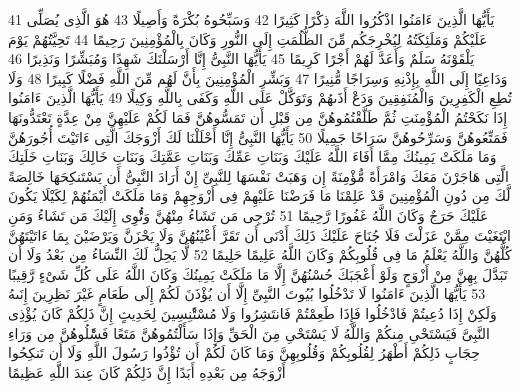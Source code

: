 \documentclass[20pt,a4paper]{article}
\begin{document}
{\tiny\colorbox{cl_aya}{41}} يَأَيُّهَا الَّذِينَ ءَامَنُوا اذْكُرُوا اللَّهَ ذِكْرًا كَثِيرًا
{\tiny\colorbox{cl_aya}{42}} وَسَبِّحُوهُ بُكْرَةً وَأَصِيلًا
{\tiny\colorbox{cl_aya}{43}} هُوَ الَّذِى يُصَلِّى عَلَيْكُمْ وَمَلَئِكَتُهُ لِيُخْرِجَكُم مِّنَ الظُّلُمَتِ إِلَى النُّورِ وَكَانَ بِالْمُؤْمِنِينَ رَحِيمًا
{\tiny\colorbox{cl_aya}{44}} تَحِيَّتُهُمْ يَوْمَ يَلْقَوْنَهُ سَلَمٌ وَأَعَدَّ لَهُمْ أَجْرًا كَرِيمًا
{\tiny\colorbox{cl_aya}{45}} يَأَيُّهَا النَّبِىُّ إِنَّا أَرْسَلْنَكَ شَهِدًا وَمُبَشِّرًا وَنَذِيرًا
{\tiny\colorbox{cl_aya}{46}} وَدَاعِيًا إِلَى اللَّهِ بِإِذْنِهِ وَسِرَاجًا مُّنِيرًا
{\tiny\colorbox{cl_aya}{47}} وَبَشِّرِ الْمُؤْمِنِينَ بِأَنَّ لَهُم مِّنَ اللَّهِ فَضْلًا كَبِيرًا
{\tiny\colorbox{cl_aya}{48}} وَلَا تُطِعِ الْكَفِرِينَ وَالْمُنَفِقِينَ وَدَعْ أَذَىهُمْ وَتَوَكَّلْ عَلَى اللَّهِ وَكَفَى بِاللَّهِ وَكِيلًا
{\tiny\colorbox{cl_aya}{49}} يَأَيُّهَا الَّذِينَ ءَامَنُوا إِذَا نَكَحْتُمُ الْمُؤْمِنَتِ ثُمَّ طَلَّقْتُمُوهُنَّ مِن قَبْلِ أَن تَمَسُّوهُنَّ فَمَا لَكُمْ عَلَيْهِنَّ مِنْ عِدَّةٍ تَعْتَدُّونَهَا فَمَتِّعُوهُنَّ وَسَرِّحُوهُنَّ سَرَاحًا جَمِيلًا
{\tiny\colorbox{cl_aya}{50}} يَأَيُّهَا النَّبِىُّ إِنَّا أَحْلَلْنَا لَكَ أَزْوَجَكَ الَّتِى ءَاتَيْتَ أُجُورَهُنَّ وَمَا مَلَكَتْ يَمِينُكَ مِمَّا أَفَاءَ اللَّهُ عَلَيْكَ وَبَنَاتِ عَمِّكَ وَبَنَاتِ عَمَّتِكَ وَبَنَاتِ خَالِكَ وَبَنَاتِ خَلَتِكَ الَّتِى هَاجَرْنَ مَعَكَ وَامْرَأَةً مُّؤْمِنَةً إِن وَهَبَتْ نَفْسَهَا لِلنَّبِىِّ إِنْ أَرَادَ النَّبِىُّ أَن يَسْتَنكِحَهَا خَالِصَةً لَّكَ مِن دُونِ الْمُؤْمِنِينَ قَدْ عَلِمْنَا مَا فَرَضْنَا عَلَيْهِمْ فِى أَزْوَجِهِمْ وَمَا مَلَكَتْ أَيْمَنُهُمْ لِكَيْلَا يَكُونَ عَلَيْكَ حَرَجٌ وَكَانَ اللَّهُ غَفُورًا رَّحِيمًا
{\tiny\colorbox{cl_aya}{51}} تُرْجِى مَن تَشَاءُ مِنْهُنَّ وَتُْٔوِى إِلَيْكَ مَن تَشَاءُ وَمَنِ ابْتَغَيْتَ مِمَّنْ عَزَلْتَ فَلَا جُنَاحَ عَلَيْكَ ذَلِكَ أَدْنَى أَن تَقَرَّ أَعْيُنُهُنَّ وَلَا يَحْزَنَّ وَيَرْضَيْنَ بِمَا ءَاتَيْتَهُنَّ كُلُّهُنَّ وَاللَّهُ يَعْلَمُ مَا فِى قُلُوبِكُمْ وَكَانَ اللَّهُ عَلِيمًا حَلِيمًا
{\tiny\colorbox{cl_aya}{52}} لَّا يَحِلُّ لَكَ النِّسَاءُ مِن بَعْدُ وَلَا أَن تَبَدَّلَ بِهِنَّ مِنْ أَزْوَجٍ وَلَوْ أَعْجَبَكَ حُسْنُهُنَّ إِلَّا مَا مَلَكَتْ يَمِينُكَ وَكَانَ اللَّهُ عَلَى كُلِّ شَىْءٍ رَّقِيبًا
{\tiny\colorbox{cl_aya}{53}} يَأَيُّهَا الَّذِينَ ءَامَنُوا لَا تَدْخُلُوا بُيُوتَ النَّبِىِّ إِلَّا أَن يُؤْذَنَ لَكُمْ إِلَى طَعَامٍ غَيْرَ نَظِرِينَ إِنَىهُ وَلَكِنْ إِذَا دُعِيتُمْ فَادْخُلُوا فَإِذَا طَعِمْتُمْ فَانتَشِرُوا وَلَا مُسْتَْٔنِسِينَ لِحَدِيثٍ إِنَّ ذَلِكُمْ كَانَ يُؤْذِى النَّبِىَّ فَيَسْتَحْىِ مِنكُمْ وَاللَّهُ لَا يَسْتَحْىِ مِنَ الْحَقِّ وَإِذَا سَأَلْتُمُوهُنَّ مَتَعًا فَسَْٔلُوهُنَّ مِن وَرَاءِ حِجَابٍ ذَلِكُمْ أَطْهَرُ لِقُلُوبِكُمْ وَقُلُوبِهِنَّ وَمَا كَانَ لَكُمْ أَن تُؤْذُوا رَسُولَ اللَّهِ وَلَا أَن تَنكِحُوا أَزْوَجَهُ مِن بَعْدِهِ أَبَدًا إِنَّ ذَلِكُمْ كَانَ عِندَ اللَّهِ عَظِيمًا
\end{document}
